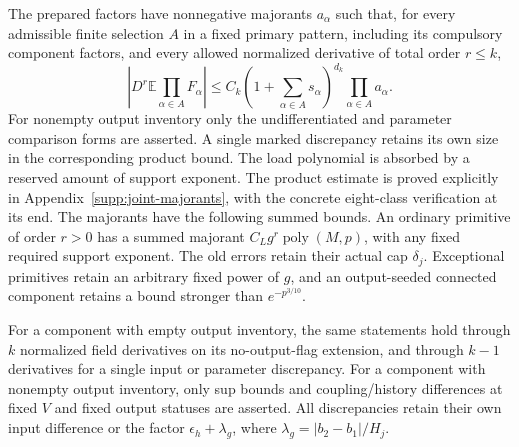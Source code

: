 \begin{lemma}
\label{rg:joint}
The prepared factors have nonnegative majorants $a_\alpha$ such that,
for every admissible finite selection $A$ in a fixed primary pattern,
including its compulsory component factors, and every
allowed normalized derivative of total order $r\le k$,
\begin{equation}
 \left|D^r\mathbb E\prod_{\alpha\in A}F_\alpha\right|
 \le C_k\left(1+\sum_{\alpha\in A}s_\alpha\right)^{d_k}
                      \prod_{\alpha\in A}a_\alpha.
 \label{rg:joint-product}
\end{equation}
For nonempty output inventory only the undifferentiated and parameter
comparison forms are asserted. A single marked discrepancy retains its
own size in the corresponding product bound. The load polynomial is
absorbed by a reserved amount of support exponent. The product estimate
is proved explicitly in Appendix~\ref{supp:joint-majorants}, with the
concrete eight-class verification at its end. The majorants have the
following summed bounds.
An ordinary primitive of order $r>0$ has a summed majorant
$C_Lg^r\operatorname{poly}(M,p)$, with any fixed required support
exponent.  The old errors retain their actual cap $\delta_j$.
Exceptional primitives retain an arbitrary fixed power of $g$,
and an output-seeded connected component retains a bound stronger
than $e^{-p^{3/10}}$.

For a component with empty output inventory, the same statements
hold through $k$ normalized field derivatives on its
no-output-flag extension, and through $k-1$ derivatives for a single
input or parameter discrepancy.  For a component with nonempty
output inventory, only sup bounds and coupling/history differences
at fixed $V$ and fixed output statuses are asserted.  All
discrepancies retain their own input difference or the factor
$\epsilon_h+\lambda_g$, where $\lambda_g=|b_2-b_1|/H_j$.
\end{lemma}
